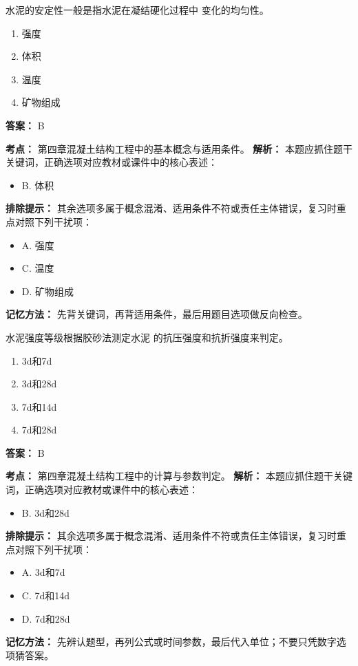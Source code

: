 \documentclass[UTF8,fontset=fandol,11pt]{ctexart}
\begin{document}
\begin{quizbox}[title={第 44 题}]
水泥的安定性一般是指水泥在凝结硬化过程中 变化的均匀性。\\
\begin{enumerate}[label=\Alph*.]
\item 强度
\item 体积
\item 温度
\item 矿物组成
\end{enumerate}
\textbf{答案：} B
\vspace{0.25em}
\begin{answerbox}[title={考点解析}]
\textbf{考点：} 第四章混凝土结构工程中的基本概念与适用条件。
\textbf{解析：} 本题应抓住题干关键词，正确选项对应教材或课件中的核心表述：
\begin{itemize}
\item B. 体积
\end{itemize}
\textbf{排除提示：} 其余选项多属于概念混淆、适用条件不符或责任主体错误，复习时重点对照下列干扰项：
\begin{itemize}
\item A. 强度
\item C. 温度
\item D. 矿物组成
\end{itemize}
\textbf{记忆方法：} 先背关键词，再背适用条件，最后用题目选项做反向检查。
\end{answerbox}
\end{quizbox}

\vspace{0.2em}

\begin{quizbox}[title={第 45 题}]
水泥强度等级根据胶砂法测定水泥 的抗压强度和抗折强度来判定。\\
\begin{enumerate}[label=\Alph*.]
\item 3d和7d
\item 3d和28d
\item 7d和14d
\item 7d和28d
\end{enumerate}
\textbf{答案：} B
\vspace{0.25em}
\begin{answerbox}[title={考点解析}]
\textbf{考点：} 第四章混凝土结构工程中的计算与参数判定。
\textbf{解析：} 本题应抓住题干关键词，正确选项对应教材或课件中的核心表述：
\begin{itemize}
\item B. 3d和28d
\end{itemize}
\textbf{排除提示：} 其余选项多属于概念混淆、适用条件不符或责任主体错误，复习时重点对照下列干扰项：
\begin{itemize}
\item A. 3d和7d
\item C. 7d和14d
\item D. 7d和28d
\end{itemize}
\textbf{记忆方法：} 先辨认题型，再列公式或时间参数，最后代入单位；不要只凭数字选项猜答案。
\end{answerbox}
\end{quizbox}
\end{document}
